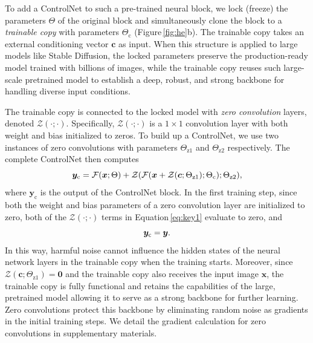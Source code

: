 \documentclass[10pt,twocolumn,letterpaper]{article}
\begin{document}
	To add a ControlNet to such a pre-trained neural block, we lock (freeze)
	the parameters $\Theta$ of the original block and simultaneously clone
	the block to a {\em trainable copy} with parameters $\Theta_\text{c}$
	(Figure\,\ref{fig:he}b).  The trainable copy takes an external
	conditioning vector $\bm{c}$ as input. When this structure is applied
	to large models like Stable Diffusion, the locked parameters preserve
	the production-ready model trained with billions of images, while the
	trainable copy reuses such large-scale pretrained model to establish a
	deep, robust, and strong backbone for handling diverse input
	conditions.
	
	The trainable copy is connected to the locked model with {\em zero convolution} layers, denoted 
	$\mathcal{Z}(\cdot;\cdot)$. Specifically,
	$\mathcal{Z}(\cdot;\cdot)$ is a $1\times 1$ convolution layer with
	both weight and bias initialized to zeros. 
	To build up a ControlNet, we use two instances of zero convolutions with parameters $\Theta_\text{z1}$
	and $\Theta_\text{z2}$ respectively. The complete ControlNet then
	computes
	\vspace{-3pt}\begin{equation}\vspace{-3pt}
		\label{eq:key1}
		\bm{y}_\text{c}=\mathcal{F}(\bm{x};\Theta)+\mathcal{Z}(\mathcal{F}(\bm{x}+\mathcal{Z}(\bm{c};\Theta_\text{z1});\Theta_\text{c});\Theta_\text{z2}),
	\end{equation}
	where $\bm{y}_\text{c}$ is the output of the ControlNet block.
	In the first training step, since both the weight and bias parameters of a zero convolution layer are initialized to zero, both of the $\mathcal{Z}(\cdot;\cdot)$ terms in Equation\,\eqref{eq:key1} evaluate to zero, 
	and
	\vspace{-3pt}\begin{equation}\vspace{-3pt}
		\label{key3}
		\bm{y}_\text{c} = \bm{y}.
	\end{equation}
	In this way, harmful noise cannot influence the hidden states of
	the neural network layers in the trainable copy when the training starts.
	Moreover,
	since $\mathcal{Z}(\bm{c};\Theta_\text{z1})=\bm{0}$ and the trainable
	copy also receives the input image $\bm{x}$, the
	trainable copy is fully functional and retains the capabilities of the large, pretrained model
	allowing it to serve as a strong backbone for further
	learning. Zero convolutions protect this backbone by
	eliminating random noise as gradients in the initial
	training steps. We detail the gradient calculation for zero
	convolutions in supplementary materials.
	
\end{document}
